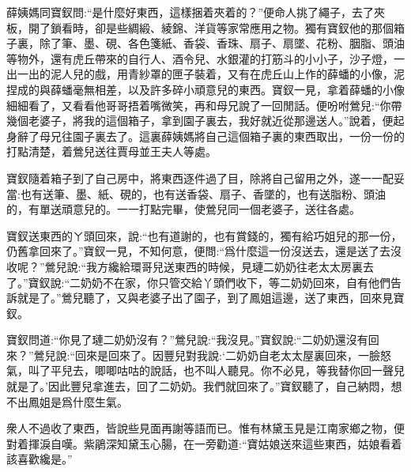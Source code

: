 \begin{parag}
    薛姨媽同寶釵問:“是什麼好東西，這樣捆着夾着的？”便命人挑了繩子，去了夾板，開了鎖看時，卻是些綢緞、綾錦、洋貨等家常應用之物。獨有寶釵他的那個箱子裏，除了筆、墨、硯、各色箋紙、香袋、香珠、扇子、扇墜、花粉、胭脂、頭油等物外，還有虎丘帶來的自行人、酒令兒、水銀灌的打筋斗的小小子，沙子燈，一出一出的泥人兒的戲，用青紗罩的匣子裝着，又有在虎丘山上作的薛蟠的小像，泥捏成的與薛蟠毫無相差，以及許多碎小頑意兒的東西。寶釵一見，拿着薛蟠的小像細細看了，又看看他哥哥捂着嘴微笑，再和母兄說了一回閒話。便吩咐鶯兒:“你帶幾個老婆子，將我的這個箱子，拿到園子裏去，我好就近從那邊送人。”說着，便起身辭了母兄往園子裏去了。這裏薛姨媽將自己這個箱子裏的東西取出，一份一份的打點清楚，着鶯兒送往賈母並王夫人等處。
\end{parag}


\begin{parag}
    寶釵隨着箱子到了自己房中，將東西逐件過了目，除將自己留用之外，遂一一配妥當:也有送筆、墨、紙、硯的，也有送香袋、扇子、香墜的，也有送脂粉、頭油的，有單送頑意兒的。一一打點完畢，使鶯兒同一個老婆子，送往各處。
\end{parag}


\begin{parag}
    寶釵送東西的ㄚ頭回來，說:“也有道謝的，也有賞錢的，獨有給巧姐兒的那一份，仍舊拿回來了。”寶釵一見，不知何意，便問:“爲什麼這一份沒送去，還是送了去沒收呢？”鶯兒說:“我方纔給環哥兒送東西的時候，見璉二奶奶往老太太房裏去了。”寶釵說:“二奶奶不在家，你只管交給丫頭們收下，等二奶奶回來，自有他們告訴就是了。”鶯兒聽了，又與老婆子出了園子，到了鳳姐這邊，送了東西，回來見寶釵。
\end{parag}


\begin{parag}
    寶釵問道:“你見了璉二奶奶沒有？”鶯兒說:“我沒見。”寶釵說:“二奶奶還沒有回來？”鶯兒說:“回來是回來了。因豐兒對我說:‘二奶奶自老太太屋裏回來，一臉怒氣，叫了平兒去，唧唧咕咕的說話，也不叫人聽見。你不必見，等我替你回一聲兒就是了。’因此豐兒拿進去，回了二奶奶。我們就回來了。”寶釵聽了，自己納悶，想不出鳳姐是爲什麼生氣。
\end{parag}


\begin{parag}
    衆人不過收了東西，皆說些見面再謝等語而已。惟有林黛玉見是江南家鄉之物，便對着揮淚自嘆。紫鵑深知黛玉心腸，在一旁勸道:“寶姑娘送來這些東西，姑娘看着該喜歡纔是。”
\end{parag}


